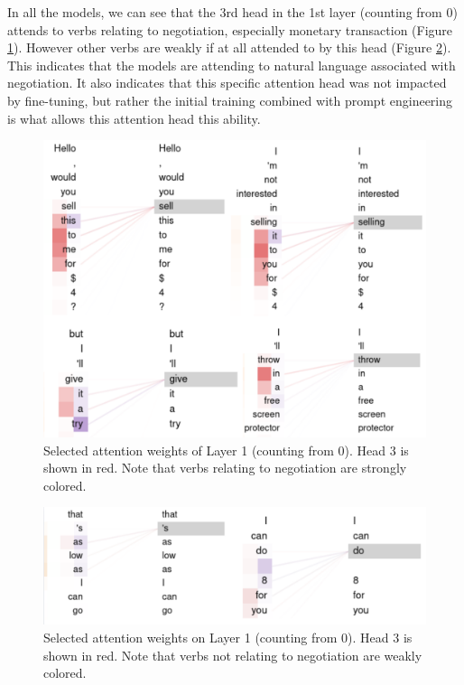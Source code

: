 \documentclass[11pt]{article}
\begin{document}
In all the models, we can see that the 3rd head in the 1st layer (counting from 0) attends to verbs relating to negotiation, especially monetary transaction (Figure \ref{fig:head3-layer1-weighted}). However other verbs are weakly if at all attended to by this head (Figure \ref{fig:head3-layer1-unweighted}). This indicates that the models are attending to natural language associated with negotiation. It also indicates that this specific attention head was not impacted by fine-tuning, but rather the initial training combined with prompt engineering is what allows this attention head this ability.

\begin{figure}[h]
    \centering
    \includegraphics[width=1\linewidth]{figures/probing/head3-layer1-weighted.png}
    \caption{Selected attention weights of Layer 1 (counting from 0). Head 3 is shown in red. Note that verbs relating to negotiation are strongly colored.}
    \label{fig:head3-layer1-weighted}
\end{figure}

\begin{figure}[h]
    \centering
    \includegraphics[width=1\linewidth]{figures/probing/head3-layer1-unweighted.png}
    \caption{Selected attention weights on Layer 1 (counting from 0). Head 3 is shown in red. Note that verbs not relating to negotiation are weakly colored.}
    \label{fig:head3-layer1-unweighted}
\end{figure}
\end{document}
